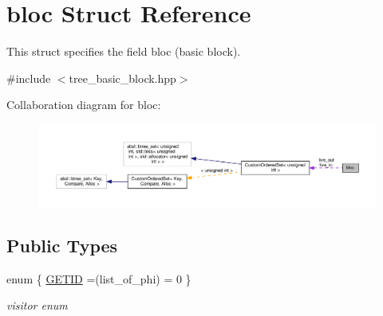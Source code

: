 \hypertarget{structbloc}{}\section{bloc Struct Reference}
\label{structbloc}


This struct specifies the field bloc (basic block).  




{\ttfamily \#include $<$tree\+\_\+basic\+\_\+block.\+hpp$>$}



Collaboration diagram for bloc\+:
\nopagebreak
\begin{figure}[H]
\begin{center}
\leavevmode
\includegraphics[width=350pt]{dc/d35/structbloc__coll__graph}
\end{center}
\end{figure}
\subsection*{Public Types}
\begin{DoxyCompactItemize}
\item 
enum \{ \hyperlink{structbloc_abbf52ab98f89180bba2ab03929dd3b11acdd45e3b7c8dd80471c324de1481aa2f}{G\+E\+T\+ID} =(list\+\_\+of\+\_\+phi) = 0
 \}\begin{DoxyCompactList}\small\item\em visitor enum \end{DoxyCompactList}
\end{DoxyCompactItemize}
